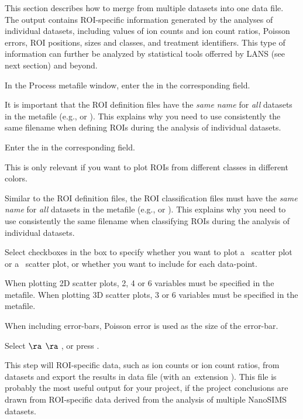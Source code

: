 \goldbox{}
This section describes how to merge  from multiple datasets into one data file. The output contains ROI-specific information generated by the analyses of individual datasets, including values of ion counts and ion count ratios, Poisson errors, ROI positions, sizes and classes, and treatment identifiers. This type of information can further be analyzed by statistical tools offerred by LANS (see next section) and beyond.
\tcbe

\s In the Process metafile window, enter the  in the corresponding field.

\nb
\bul It is important that the ROI definition files have the \emph{same name} for \emph{all} datasets in the metafile (e.g.,  or ). This explains why you need to use consistently the same filename when defining ROIs during the analysis of individual datasets.

\s Enter the  in the corresponding field.

\nb
\bul This is only relevant if you want to plot ROIs from different classes in different colors.

\bul Similar to the ROI definition files, the ROI classification files must have the \emph{same name} for \emph{all} datasets in the metafile (e.g.,  or ). This explains why you need to use consistently the same filename when classifying ROIs during the analysis of individual datasets.

\s Select checkboxes in the  box to specify whether you want to plot a~ scatter plot or a~ scatter plot, or whether you want to include  for each data-point. 

\nb
\bul When plotting 2D scatter plots, 2, 4 or 6 variables must be specified in the metafile. When plotting 3D scatter plots, 3 or 6 variables must be specified in the metafile. 

\bul When including error-bars, Poisson error is used as the size of the error-bar.

\s Select  $\ra$  $\ra$ , or press .

\nb
\bul This step will  ROI-specific data, such as ion counts or ion count ratios, from  datasets and export the results in  data file (with an~extension ). This file is probably the most useful output for your project, if the project conclusions are drawn from ROI-specific data derived from the analysis of multiple NanoSIMS datasets.

